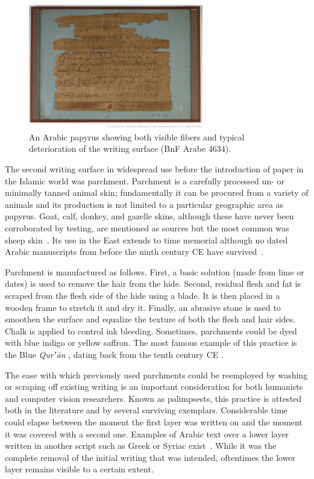 \begin{figure}
        \includegraphics[width=0.68\textwidth]{images/4644.jpg}
	\caption{An Arabic papyrus showing both visible fibers and typical
	deterioration of the writing surface (BnF Arabe 4634).}
        \label{fig:papyrus}
\end{figure}

The second writing surface in wide\-spread use before the introduction of paper
in the Islamic world was parchment. Parchment is a carefully processed un- or
minimally tanned animal skin; fundamentally it can be procured from a variety
of animals and its production is not limited to a particular geographic area as
papyrus. Goat, calf, donkey, and gazelle skins, although these have never been
corroborated by testing, are mentioned as sources but the most common was sheep
skin~\cite[pg. 44]{blair2006islamic}. Its use in the East extends to time
memorial although no dated Arabic manuscripts from before the ninth century CE
have survived~\cite[pg.33]{deroche2006islamic}. 

Parchment is manufactured as follows. First, a basic solution (made from lime
or dates) is used to remove the hair from the hide.  Second, residual flesh and
fat is scraped from the flesh side of the hide using a blade. It is then placed
in a wooden frame to stretch it and dry it. Finally, an abrasive stone is used
to smoothen the surface and equalize the texture of both the flesh and hair
sides. Chalk is applied to control ink bleeding. Sometimes, parchments could be
dyed with blue indigo or yellow saffron. The most famous example of this
practice is the Blue \emph{Qurʼān} , dating back from the tenth century CE \cite[pg.
195-196]{gacek2009arabic}.

The ease with which previously used parchments could be reemployed by washing
or scraping off existing writing is an important consideration for both
humanists and computer vision researchers. Known as palimpsests, this practice
is attested both in the literature and by several surviving exemplars.
Considerable time could elapse between the moment the first layer was written
on and the moment it was covered with a second one. Examples of Arabic text
over a lower layer written in another script such as Greek or Syriac
exist~\cite[pg. 43-46]{deroche2006islamic}. While it was the complete removal of
the initial writing that was intended, oftentimes the lower layer remains
visible to a certain extent. 

